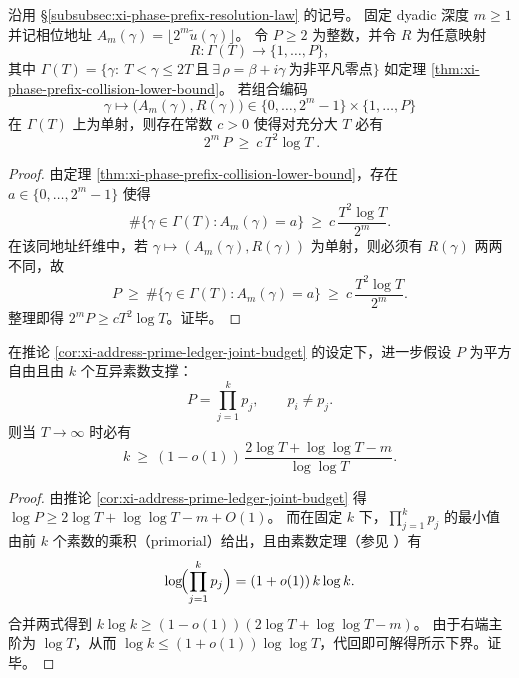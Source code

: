 \begin{corollary}[地址--外置账本的联合预算下界]\label{cor:xi-address-prime-ledger-joint-budget}
沿用 \S\ref{subsubsec:xi-phase-prefix-resolution-law} 的记号。
固定 dyadic 深度 \(m\ge 1\) 并记相位地址 \(A_m(\gamma)=\lfloor 2^m\widetilde u(\gamma)\rfloor\)。
令 \(P\ge 2\) 为整数，并令 \(R\) 为任意映射
\[
R:\Gamma(T)\to \{1,\dots,P\},
\]
其中 \(\Gamma(T)=\{\gamma:\ T<\gamma\le 2T\ \text{且}\ \exists\,\rho=\beta+i\gamma\ \text{为非平凡零点}\}\) 如定理 \ref{thm:xi-phase-prefix-collision-lower-bound}。
若组合编码
\[
\gamma\longmapsto \bigl(A_m(\gamma),R(\gamma)\bigr)\in \{0,\dots,2^m-1\}\times\{1,\dots,P\}
\]
在 \(\Gamma(T)\) 上为单射，则存在常数 \(c>0\) 使得对充分大 \(T\) 必有
\[
\boxed{\;
2^m\,P\ \ge\ c\,T^2\log T\; }.
\]
\end{corollary}

\begin{proof}
由定理 \ref{thm:xi-phase-prefix-collision-lower-bound}，存在 \(a\in\{0,\dots,2^m-1\}\) 使得
\[
\#\{\gamma\in\Gamma(T):A_m(\gamma)=a\}\ \ge\ c\,\frac{T^2\log T}{2^m}.
\]
在该同地址纤维中，若 \(\gamma\mapsto(A_m(\gamma),R(\gamma))\) 为单射，则必须有 \(R(\gamma)\) 两两不同，故
\[
P\ \ge\ \#\{\gamma\in\Gamma(T):A_m(\gamma)=a\}
\ \ge\ c\,\frac{T^2\log T}{2^m}.
\]
整理即得 \(2^mP\ge cT^2\log T\)。证毕。
\end{proof}

\begin{corollary}[平方自由素数支撑数的最小增长律]\label{cor:xi-squarefree-prime-support-min-growth}
在推论 \ref{cor:xi-address-prime-ledger-joint-budget} 的设定下，进一步假设 \(P\) 为平方自由且由 \(k\) 个互异素数支撑：
\[
P=\prod_{j=1}^{k}p_j,\qquad p_i\neq p_j.
\]
则当 \(T\to\infty\) 时必有
\[
k\ \ge\ (1-o(1))\,\frac{2\log T+\log\log T-m}{\log\log T}.
\]
\end{corollary}

\begin{proof}
由推论 \ref{cor:xi-address-prime-ledger-joint-budget} 得 \(\log P\ge 2\log T+\log\log T-m+O(1)\)。
而在固定 \(k\) 下，\(\prod_{j=1}^k p_j\) 的最小值由前 \(k\) 个素数的乘积（primorial）给出，且由素数定理（参见 \cite{Apostol1976}）有
\[
\log\!\Bigl(\prod_{j=1}^k p_j\Bigr)=(1+o(1))\,k\log k.
\]
合并两式得到 \(k\log k\ge (1-o(1))(2\log T+\log\log T-m)\)。
由于右端主阶为 \(\log T\)，从而 \(\log k\le (1+o(1))\log\log T\)，代回即可解得所示下界。证毕。
\end{proof}

\endinput
